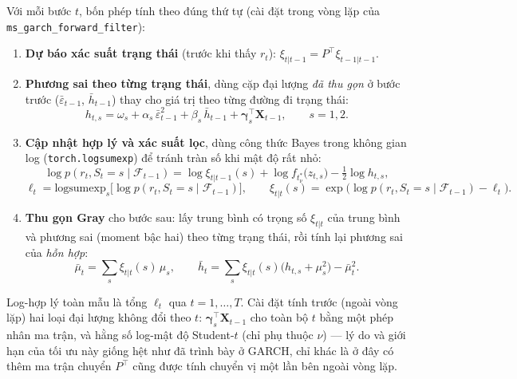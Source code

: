 \documentclass[11pt,a4paper]{article}
\newcommand{\code}[1]{\texttt{#1}}
\begin{document}
Với mỗi bước $t$, bốn phép tính theo đúng thứ tự (cài đặt trong vòng lặp của
\code{ms\_garch\_forward\_filter}):

\begin{enumerate}
  \item \textbf{Dự báo xác suất trạng thái} (trước khi thấy $r_t$):
    $\xi_{t|t-1} = P^\top \xi_{t-1|t-1}$.
  \item \textbf{Phương sai theo từng trạng thái}, dùng cặp đại lượng \emph{đã thu
    gọn} ở bước trước ($\bar\varepsilon_{t-1}$, $\bar h_{t-1}$) thay cho giá trị
    theo từng đường đi trạng thái:
    \begin{equation}
    h_{t,s} = \omega_s + \alpha_s\,\bar\varepsilon_{t-1}^2 + \beta_s\,\bar h_{t-1} +
    \boldsymbol\gamma_s^\top\mathbf X_{t-1}, \qquad s=1,2.
    \end{equation}
  \item \textbf{Cập nhật hợp lý và xác suất lọc}, dùng công thức Bayes trong không
    gian log (\code{torch.logsumexp}) để tránh tràn số khi mật độ rất nhỏ:
    \begin{equation}
    \log p(r_t, S_t{=}s \mid \mathcal F_{t-1}) = \log\xi_{t|t-1}(s) + \log
    f_{t^*_\nu}\!\big(z_{t,s}\big) - \tfrac12\log h_{t,s},
    \end{equation}
    \begin{equation}
    \ell_t = \mathrm{logsumexp}_s\big[\log p(r_t,S_t{=}s\mid\mathcal F_{t-1})\big],
    \qquad \xi_{t|t}(s) = \exp\!\big(\log p(r_t,S_t{=}s\mid\mathcal F_{t-1}) -
    \ell_t\big).
    \end{equation}
  \item \textbf{Thu gọn Gray} cho bước sau: lấy trung bình có trọng số $\xi_{t|t}$
    của trung bình và phương sai (moment bậc hai) theo từng trạng thái, rồi tính lại
    phương sai của \emph{hỗn hợp}:
    \begin{equation}
    \bar\mu_t = \sum_s \xi_{t|t}(s)\,\mu_s, \qquad
    \bar h_t = \sum_s \xi_{t|t}(s)\big(h_{t,s} + \mu_s^2\big) - \bar\mu_t^2.
    \end{equation}
\end{enumerate}

Log-hợp lý toàn mẫu là tổng $\ell_t$ qua $t=1,\dots,T$. Cài đặt tính trước (ngoài
vòng lặp) hai loại đại lượng không đổi theo $t$: $\boldsymbol\gamma_s^\top
\mathbf X_{t-1}$ cho toàn bộ $t$ bằng một phép nhân ma trận, và hằng số log-mật độ
Student-$t$ (chỉ phụ thuộc $\nu$) --- lý do và giới hạn của tối ưu này giống hệt như
đã trình bày ở GARCH, chỉ khác là ở đây có thêm ma trận chuyển $P^\top$ cũng được
tính chuyển vị một lần bên ngoài vòng lặp.
\end{document}
